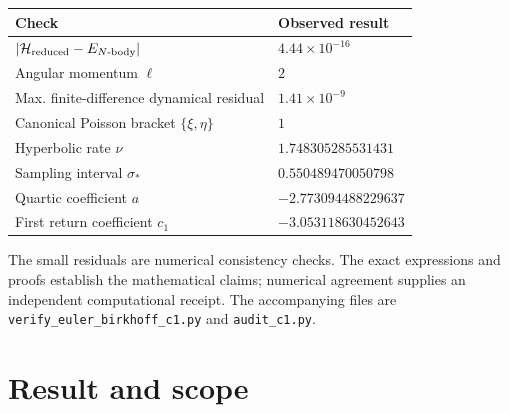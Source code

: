 \documentclass[11pt,letterpaper]{article}
\theoremstyle{paper}
\begin{document}
\begin{center}\small
\begin{tabularx}{\textwidth}{@{}>{\raggedright\arraybackslash}p{}>{\raggedleft\arraybackslash}X@{}}
\toprule
\textbf{Check} & \textbf{Observed result}\\
\midrule
$|\mathcal H_{\rm reduced}-E_{N\text{-body}}|$ & $4.44\times10^{-16}$\\
Angular momentum $\ell$ & $2$\\
Max. finite-difference dynamical residual & $1.41\times10^{-9}$\\
Canonical Poisson bracket $\{\xi,\eta\}$ & $1$\\
Hyperbolic rate $\nu$ & $1.748305285531431$\\
Sampling interval $\sigma_*$ & $0.550489470050798$\\
Quartic coefficient $a$ & $-2.773094488229637$\\
First return coefficient $c_1$ & $-3.053118630452643$\\
\bottomrule
\end{tabularx}
\end{center}

The small residuals are numerical consistency checks. The exact expressions and proofs establish the mathematical claims; numerical agreement supplies an independent computational receipt. The accompanying files are \texttt{verify\_euler\_}\allowbreak\texttt{birkhoff\_c1.py} and \texttt{audit\_c1.py}.

\section{Result and scope}

\begin{center}
\setlength{\fboxsep}{11pt}
\end{center}
\end{document}
